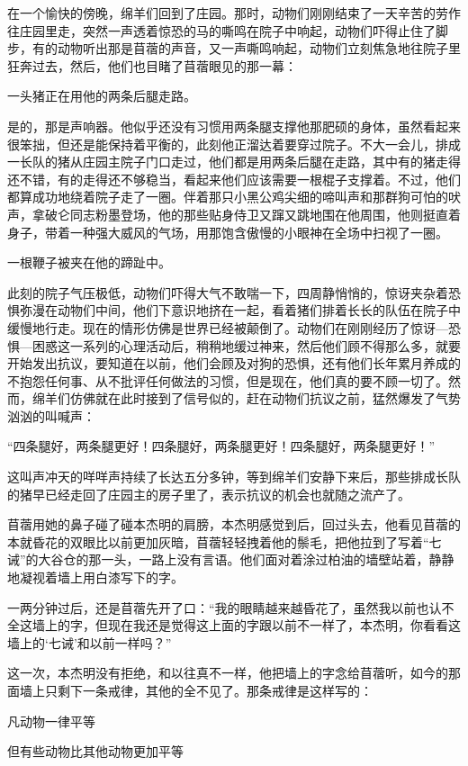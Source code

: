 在一个愉快的傍晚，绵羊们回到了庄园。那时，动物们刚刚结束了一天辛苦的劳作往庄园里走，突然一声透着惊恐的马的嘶鸣在院子中响起，动物们吓得止住了脚步，有的动物听出那是苜蓿的声音，又一声嘶鸣响起，动物们立刻焦急地往院子里狂奔过去，然后，他们也目睹了苜蓿眼见的那一幕：

一头猪正在用他的两条后腿走路。

是的，那是声响器。他似乎还没有习惯用两条腿支撑他那肥硕的身体，虽然看起来很笨拙，但还是能保持着平衡的，此刻他正溜达着要穿过院子。不大一会儿，排成一长队的猪从庄园主院子门口走过，他们都是用两条后腿在走路，其中有的猪走得还不错，有的走得还不够稳当，看起来他们应该需要一根棍子支撑着。不过，他们都算成功地绕着院子走了一圈。伴着那只小黑公鸡尖细的啼叫声和那群狗可怕的吠声，拿破仑同志粉墨登场，他的那些贴身侍卫又蹿又跳地围在他周围，他则挺直着身子，带着一种强大威风的气场，用那饱含傲慢的小眼神在全场中扫视了一圈。

一根鞭子被夹在他的蹄趾中。

此刻的院子气压极低，动物们吓得大气不敢喘一下，四周静悄悄的，惊讶夹杂着恐惧弥漫在动物们中间，他们下意识地挤在一起，看着猪们排着长长的队伍在院子中缓慢地行走。现在的情形仿佛是世界已经被颠倒了。动物们在刚刚经历了惊讶—恐惧—困惑这一系列的心理活动后，稍稍地缓过神来，然后他们顾不得那么多，就要开始发出抗议，要知道在以前，他们会顾及对狗的恐惧，还有他们长年累月养成的不抱怨任何事、从不批评任何做法的习惯，但是现在，他们真的要不顾一切了。然而，绵羊们仿佛就在此时接到了信号似的，赶在动物们抗议之前，猛然爆发了气势汹汹的叫喊声：

“四条腿好，两条腿更好！四条腿好，两条腿更好！四条腿好，两条腿更好！”

这叫声冲天的咩咩声持续了长达五分多钟，等到绵羊们安静下来后，那些排成长队的猪早已经走回了庄园主的房子里了，表示抗议的机会也就随之流产了。

苜蓿用她的鼻子碰了碰本杰明的肩膀，本杰明感觉到后，回过头去，他看见苜蓿的本就昏花的双眼比以前更加灰暗，苜蓿轻轻拽着他的鬃毛，把他拉到了写着“七诫”的大谷仓的那一头，一路上没有言语。他们面对着涂过柏油的墙壁站着，静静地凝视着墙上用白漆写下的字。

一两分钟过后，还是苜蓿先开了口：“我的眼睛越来越昏花了，虽然我以前也认不全这墙上的字，但现在我还是觉得这上面的字跟以前不一样了，本杰明，你看看这墙上的‘七诫’和以前一样吗？”

这一次，本杰明没有拒绝，和以往真不一样，他把墙上的字念给苜蓿听，如今的那面墙上只剩下一条戒律，其他的全不见了。那条戒律是这样写的：

凡动物一律平等

但有些动物比其他动物更加平等

